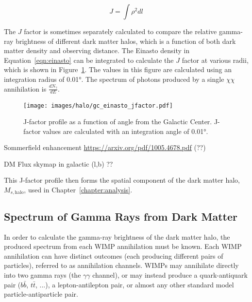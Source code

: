     \begin{equation}\label{eqn:jfactor}
      J = \int \rho^2 dl
    \end{equation}

    The $J$ factor is sometimes separately calculated to compare the relative gamma-ray brightness of different dark matter halos, which is a function of both dark matter density and observing distance.
    The Einasto density in Equation~\ref{eqn:einasto} can be integrated to calculate the $J$ factor at various radii, which is shown in Figure~\ref{fig:gchalo_jfactor}.
    The values in this figure are calculated using an integration radius of \ang{0.01}.
    The spectrum of photons produced by a single $\chi\chi$ annihilation is $\frac{dN_{\gamma}}{dE}$.
    
    \begin{figure}[ht]
    \centering
      \texttt{[image: images/halo/gc\_einasto\_jfactor.pdf]}
      \caption[Galactic Center Einasto Halo Jfactor]{
        J-factor profile as a function of angle from the Galactic Center.
        J-factor values are calculated with an integration angle of \ang{0.01}.
      }
      \label{fig:gchalo_jfactor}
    \end{figure}
    

    {\color{red}Sommerfield enhancement \url{https://arxiv.org/pdf/1005.4678.pdf} (??)}

    
    {\color{red}DM Flux skymap in galactic (l,b) ??}
    
    This J-factor profile then forms the spatial component of the dark matter halo, $M_{s,\textrm{halo}}$, used in Chapter~\ref{chapter:analysis}.
    
  \subsection{Spectrum of Gamma Rays from Dark Matter}\label{dm_spectral}
    In order to calculate the gamma-ray brightness of the dark matter halo, the produced spectrum from each WIMP annihilation must be known.
    Each WIMP annihilation can have distinct outcomes (each producing different pairs of particles), referred to as annihilation channels.
    WIMPs may annihilate directly into two gamma rays (the $\gamma\gamma$ channel), or may instead produce a quark-antiquark pair ($b\bar{b}$, $t\bar{t}$, ...), a lepton-antilepton pair, or almost any other standard model particle-antiparticle pair.

